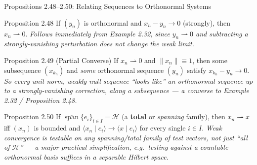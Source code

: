 \documentclass[aspectratio=169,10pt]{beamer}
\DeclareMathOperator{\spn}{span}
\newcommand{\Hil}{\mathcal{H}}
\newcommand{\wto}{\rightharpoonup}
\newcommand{\ip}[2]{\langle #1 \mid #2 \rangle}
\begin{document}
\begin{frame}{Propositions 2.48--2.50: Relating Sequences to Orthonormal Systems}
  \begin{block}{Proposition 2.48}
    If $(y_n)$ is orthonormal and $x_n - y_n\to 0$ (strongly), then
    $x_n\wto 0$. \textit{Follows immediately from Example 2.32, since
    $y_n\wto 0$ and subtracting a strongly-vanishing perturbation does not
    change the weak limit.}
  \end{block}

  \begin{block}{Proposition 2.49 (Partial Converse)}
    If $x_n\wto 0$ and $\|x_n\|\equiv 1$, then some subsequence
    $(x_{k_n})$ and \emph{some} orthonormal sequence $(y_n)$ satisfy
    $x_{k_n}-y_n\to 0$. \textit{So every unit-norm, weakly-null sequence
    ``looks like'' an orthonormal sequence up to a strongly-vanishing
    correction, along a subsequence --- a converse to Example 2.32 /
    Proposition 2.48.}
  \end{block}

  \begin{block}{Proposition 2.50}
    If $\overline{\spn}\{e_i\}_{i\in I}=\Hil$ (a \textbf{total} or
    \emph{spanning} family), then $x_n\wto x$ iff $(x_n)$ is bounded and
    $\ip{x_n}{e_i}\to\ip{x}{e_i}$ for every single $i\in I$. \textit{Weak
    convergence is testable on any spanning/total family of test vectors,
    not just ``all of $\Hil$'' --- a major practical simplification, e.g.\
    testing against a countable orthonormal basis suffices in a separable
    Hilbert space.}
  \end{block}
\end{frame}
\end{document}

